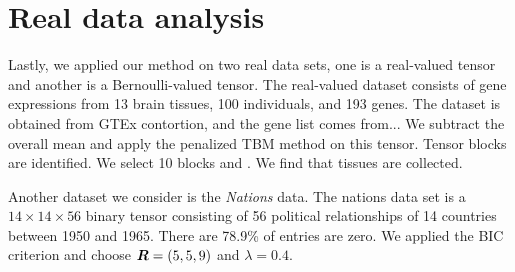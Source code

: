 \documentclass{article}
\begin{document}
\begin{table}[http]
	\caption{Results for sparse tensor block estimation under dimension $\md=(40,40,40)$. The reported $\bar \lambda$ is the mean of $\lambda$ selected across 50 simulations using our proposed BIC criterion. Number in bold indicates no significant difference between the estimate and the ground truth, based on a $z$-test with a level 0.05.}\label{t5}
\end{table}


\section{Real data analysis}
Lastly, we applied our method on two real data sets, one is a real-valued tensor and another is a Bernoulli-valued tensor. The real-valued dataset consists of gene expressions from 13 brain tissues, 100 individuals, and 193 genes. The dataset is obtained from GTEx contortion, and the gene list comes from... We subtract the overall mean and apply the penalized TBM method on this tensor. Tensor blocks are identified. We select 10 blocks and . We find that tissues are collected.

Another dataset we consider is the \emph{Nations} data. The nations data set is a $14\times 14 \times 56$ binary tensor consisting of 56 political relationships of 14 countries between 1950 and 1965. There are 78.9\% of entries are zero. We applied the BIC criterion and choose $\bm{R}=(5,5,9)$ and $\lambda=0.4$. 
\end{document}
